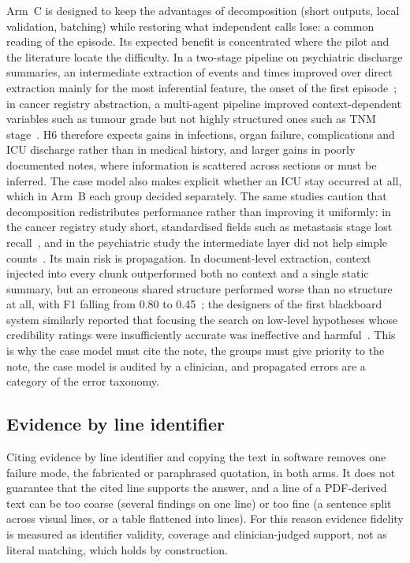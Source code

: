 Arm~C is designed to keep the advantages of decomposition (short outputs, local validation, batching) while
restoring what independent calls lose: a common reading of the episode. Its expected benefit is concentrated
where the pilot and the literature locate the difficulty. In a two-stage pipeline on psychiatric discharge
summaries, an intermediate extraction of events and times improved over direct extraction mainly for the most
inferential feature, the onset of the first episode~\cite{psych2stage2026}; in cancer registry abstraction, a
multi-agent pipeline improved context-dependent variables such as tumour grade but not highly structured ones
such as TNM stage~\cite{cancerregistrymas2026}. H6 therefore expects gains in infections, organ failure,
complications and ICU discharge rather than in medical history, and larger gains in poorly documented notes,
where information is scattered across sections or must be inferred. The case model also makes explicit whether
an ICU stay occurred at all, which in Arm~B each group decided separately. The same studies caution that
decomposition redistributes performance rather than improving it uniformly: in the cancer registry study
short, standardised fields such as metastasis stage lost recall~\cite{cancerregistrymas2026}, and in the
psychiatric study the intermediate layer did not help simple counts~\cite{psych2stage2026}. Its main risk is
propagation. In document-level extraction, context injected into every chunk outperformed both no context and
a single static summary, but an erroneous shared structure performed worse than no structure at all, with F1
falling from 0.80 to 0.45~\cite{hisccg2026}; the designers of the first blackboard system similarly reported that
focusing the search on low-level hypotheses whose credibility ratings were insufficiently accurate was
ineffective and harmful~\cite{erman1980hearsay}. This is why the case model must cite the note, the groups must give priority to
the note, the case model is audited by a clinician, and propagated errors are a category of the error
taxonomy. 

\subsection{Evidence by line identifier}

Citing evidence by line identifier and copying the text in software removes one failure mode, the
fabricated or paraphrased quotation, in both arms. It does not guarantee that the cited line supports the
answer, and a line of a PDF-derived text can be too coarse (several findings on one line) or too fine (a
sentence split across visual lines, or a table flattened into lines). For this reason evidence fidelity
is measured as identifier validity, coverage and clinician-judged support, not as literal matching, which
holds by construction. 

